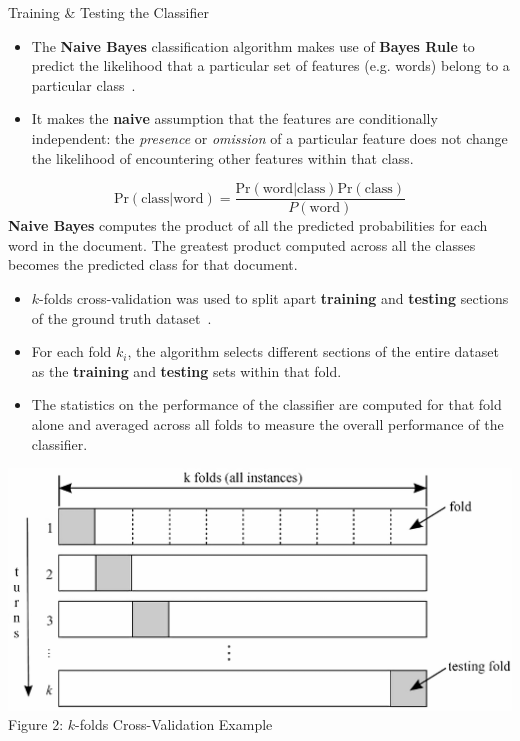 \documentclass[12pt]{article}
\begin{document}
\begin{posterbard}
\begin{posterboxtitle}{Training \& Testing the Classifier}
\begin{itemize}
\item The \textbf{Naive Bayes} classification algorithm makes use of \textbf{Bayes Rule} to predict the likelihood that a particular set of features (e.g. words) belong to a particular class~\cite{naive_bayes}.
\item It makes the \textbf{naive} assumption that the features are conditionally independent: the \textit{presence} or \textit{omission} of a particular feature does not change the likelihood of encountering other features within that class.
\end{itemize}
\[{\text{Pr}(\text{class}|\text{word})}=\frac{\text{Pr}(\text{word}|\text{class})\text{Pr}(\text{class})}{P(\text{word})}\] 
\noindent
\textbf{Naive Bayes} computes the product of all the predicted probabilities for each word in the document. The greatest product computed across all the classes becomes the predicted class for that document.

\begin{itemize}
\item $k$-folds cross-validation was used to split apart \textbf{training} and \textbf{testing} sections of the ground truth dataset~\cite{k_folds}. 
\item For each fold $k_{i}$, the algorithm selects different sections of the entire dataset as the \textbf{training} and \textbf{testing} sets within that fold.
\item The statistics on the performance of the classifier are computed for that fold alone and averaged across all folds to measure the overall performance of the classifier.
\end{itemize}
\begin{center}
\includegraphics[width=\textwidth]{k_folds_new.png}\\
Figure 2: $k$-folds Cross-Validation Example \cite{k_folds}
\end{center}


\end{posterboxtitle}
\end{posterbard}
\end{document}
